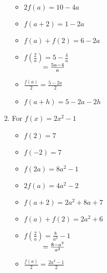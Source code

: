 \documentclass{ximera}
\begin{document}
\begin{enumerate}
\begin{itemize}
\item  $2 f(a) = 10-4a$
\item $f(a+2) = 1-2a$
\item $f(a) + f(2) = 6-2a$

\end{itemize}


\begin{itemize}

\item  $f \left( \frac{2}{a} \right) = 5 - \frac{4}{a}$ \\
$\hphantom{f \left( \frac{2}{a} \right)} = \frac{5a-4}{a}$

 

 

\item $\frac{f(a)}{2} = \frac{5-2a}{2}$

 

 


\item  $f(a + h) = 5-2a-2h$

\end{itemize}




\item For $f(x) = 2x^2-1$


\begin{itemize}

\item  $f(2) = 7$
\item  $f(-2) = 7$
\item  $f(2a) = 8a^2-1$

\end{itemize}


\begin{itemize}

\item  $2 f(a) = 4a^2-2$
\item $f(a+2) = 2a^2+8a+7$
\item $f(a) + f(2) = 2a^2+6$

\end{itemize}


\begin{itemize}

\item  $f \left( \frac{2}{a} \right) = \frac{8}{a^2} - 1$ \\
$\hphantom{f \left( \frac{2}{a} \right)} = \frac{8-a^2}{a^2}$

 

 

\item $\frac{f(a)}{2} =  \frac{2a^2-1}{2}$


\end{itemize}
\end{enumerate}
\end{document}
